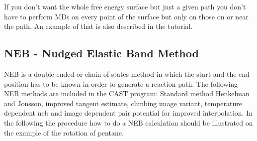 \documentclass[10pt,a4paper]{article} %
\begin{document}
    If you don't want the whole free energy surface but just a given path you don't have to perform MDs on every point of the surface but only on those on or near the path. An example of that is also described in the tutorial.

	\subsection{NEB - Nudged Elastic Band Method}	
NEB is a double ended or chain of states method in which the start and the end position has to be known in order to generate a reaction path. 
The following NEB methods are included in the CAST program: Standard method Henkelman and Jonsson\supercite{JonssonH.1998}, improved tangent estimate\supercite{Henkelman2000}, climbing image variant\supercite{Henkelman2000a}, temperature dependent neb\supercite{Crehuet2003} and image dependent pair potential for improved interpolation\supercite{Smidstrup2014}.
In the following the procedure how to do a NEB calculation should be illustrated on the example of the rotation of pentane.\newline
\end{document}
